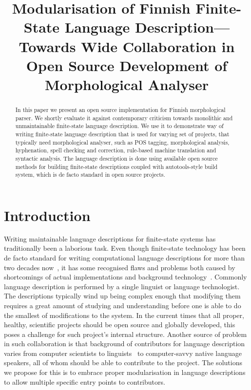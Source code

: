 \documentclass[11pt]{article}
\title{Modularisation of Finnish Finite-State Language Description---Towards
Wide Collaboration in Open Source Development of Morphological Analyser}
\begin{document}
\maketitle
\begin{abstract}
In this paper we present an open source implementation for Finnish
morphological parser. We shortly evaluate it against contemporary criticism
towards monolithic and unmaintainable finite-state language description.  We
use it to demonstrate way of writing finite-state language description that is
used for varying set of projects, that typically need morphological analyser,
such as POS tagging, morphological analysis, hyphenation, spell checking and
correction, rule-based machine translation and syntactic analysis.  The
language description is done using available open source methods for building
finite-state descriptions coupled with autotools-style build system, which is
de facto standard in open source projects.
\end{abstract}

\section{Introduction}

Writing maintainable language descriptions for finite-state systems has
traditionally been a laborious task. Even though finite-state technology has
been de facto standard for writing computational language descriptions for more
than two decades now~\cite{beesley/2003}, it has some recognised flaws and
problems both caused by shortcomings of actual implementations and
background technology~\cite{wintner/2008}. Commonly language description is
performed by a single linguist or language technologist. The descriptions
typically wind up being complex enough that modifying them requires a great
amount of studying and understanding before one is able to do the smallest of
modifications to the system. In the current times that all proper, healthy,
scientific projects should be open source and globally developed, this poses a
challenge for such project's internal structure. Another source of problem in
such collaboration is that background of contributors for language description
varies from computer scientists to linguists~\cite{maxwell/2008} to
computer-savvy native language speakers, all of whom should be able to
contribute to the project.  The solutions we propose for this is to embrace
proper modularisation in language descriptions to allow multiple specific
entry points to contributors.
\end{document}
